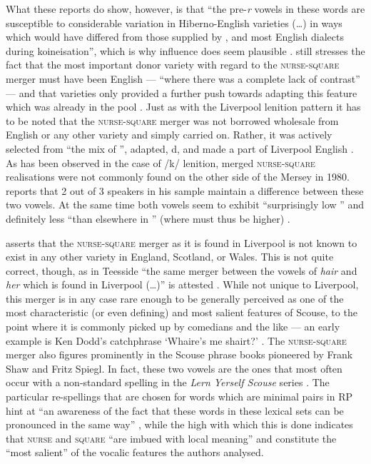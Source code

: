What these reports do show, however, is that ``the pre-\emph{r} vowels in these words are susceptible to considerable variation in Hiberno-English varieties (\ldots) in ways which would have differed from those supplied by ,  and most English dialects during koineisation'', which is why  influence does seem plausible \citep[128]{honeybone2007}.
\parencite{honeybone2007} still stresses the fact that the most important donor variety with regard to the \textsc{nurse}-\textsc{square} merger must have been  English --- ``where there was a complete lack of contrast'' --- and that  varieties only provided a further push towards adapting this feature which was already in the pool \citep[129]{honeybone2007}.
Just as with the Liverpool lenition pattern it has to be noted that the \textsc{nurse}-\textsc{square} merger was not borrowed wholesale from  English or any other variety and simply carried on. 
Rather, it was actively selected from ``the mix of '', adapted, d, and made a part of Liverpool English \parencite[cf.][129]{honeybone2007}.
As has been observed in the case of /k/ lenition, merged \textsc{nurse}-\textsc{square} realisations were not commonly found on the other side of the Mersey in 1980.
\textcite[95]{newbrook1999} reports that 2 out of 3 speakers in his sample maintain a difference between these two vowels.
At the same time both vowels seem to exhibit ``surprisingly low '' and definitely less ``than elsewhere in '' (where  must thus be higher) \parencite[95]{newbrook1999}.

\citet[cf.][128]{honeybone2007} asserts that the \textsc{nurse}-\textsc{square} merger as it is found in Liverpool is not known to exist in any other variety in England, Scotland, or Wales.
This is not quite correct, though, as in Teesside ``the same merger between the vowels of \emph{hair} and \emph{her} which is found in Liverpool (\dots)'' is attested \parencite[70]{trudgill1999}.
While not unique to Liverpool, this merger is in any case rare enough to be generally perceived as one of the most characteristic (or even defining) and most salient features of Scouse, to the point where it is commonly picked up by comedians and the like --- an early example is Ken Dodd's catchphrase `Whaire's me shairt?' \citep[cf.][73]{trudgill1999}.
The \textsc{nurse}-\textsc{square} merger also figures prominently in the Scouse phrase books pioneered by Frank Shaw and Fritz Spiegl.
In fact, these two vowels are the ones that most often occur with a non-standard spelling in the \emph{Lern Yerself Scouse} series \parencite[cf.][322]{honeybonewatson2013}.
The particular re-spellings that are chosen for words which are minimal pairs in RP hint at ``an awareness of the fact that these words in these lexical sets can be pronounced in the same way'' \parencite[324]{honeybonewatson2013}, while the high  with which this is done indicates that \textsc{nurse} and \textsc{square} ``are imbued with local meaning'' and constitute the ``most salient'' of the vocalic features the authors analysed.

